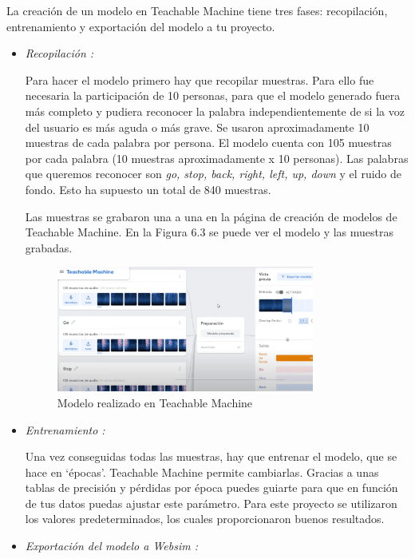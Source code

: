 La creación de un modelo en Teachable Machine tiene tres fases: recopilación, entrenamiento y exportación del modelo a tu proyecto.

\begin{itemize}
\item \textit{Recopilación :}

Para hacer el modelo primero hay que recopilar muestras. Para ello fue necesaria la participación de 10 personas, para que el modelo generado fuera más completo y pudiera reconocer la palabra independientemente de si la voz del usuario es más aguda o más grave.  Se usaron aproximadamente 10 muestras de cada palabra por persona. El modelo cuenta con 105 muestras por cada palabra (10 muestras aproximadamente x 10 personas). Las palabras que queremos reconocer son \textit{go, stop, back, right, left, up, down } y el ruido de fondo. Esto ha supuesto un total de 840 muestras.

Las muestras se grabaron una a una en la página de creación de modelos de Teachable Machine. En la Figura 6.3 se puede ver el modelo y las muestras grabadas.


\begin{figure}[H]
 \centering
    \includegraphics[width=0.8\textwidth, height=0.4\textwidth]{chapters/images/teachablemachine.png}
    \caption{Modelo realizado en Teachable Machine}
\end{figure}
 

\item  \textit{Entrenamiento :}

Una vez conseguidas todas las muestras, hay que entrenar el modelo, que se hace en `épocas'. Teachable Machine permite cambiarlas. Gracias a unas tablas de precisión y pérdidas por época puedes guiarte para que en función de tus datos puedas ajustar este parámetro. Para este proyecto se utilizaron los valores predeterminados, los cuales proporcionaron buenos resultados.

\item  \textit{Exportación del modelo a Websim :}


\end{itemize}
